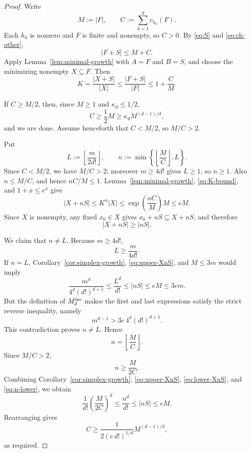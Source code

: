\documentclass[11pt]{article}
\theoremstyle{definition}
\newcommand{\1}{\mathbf{1}}
\begin{document}
\begin{proof}
Write
\[
  M:=|F|,
  \qquad
  C:=\sum_{k=1}^d c_{h_k}(F).
\]
Each $h_k$ is nonzero and $F$ is finite and nonempty, so $C>0$.  By \eqref{eq:S} and \eqref{eq:ch-other},
\begin{equation}\label{eq:FplusS}
  |F+S|
  \le M+C.
\end{equation}
Apply Lemma~\ref{lem:minimal-growth} with $A=F$ and $B=S$, and choose the minimizing nonempty $X\subseteq F$.  Then
\begin{equation}\label{eq:K-bound}
  K=\frac{|X+S|}{|X|}
  \le\frac{|F+S|}{|F|}
  \le1+\frac CM.
\end{equation}

If $C\ge M/2$, then, since $M\ge1$ and $\kappa_d\le1/2$,
\[
  C\ge\frac12M\ge\kappa_d M^{(d-1)/d},
\]
and we are done.  Assume henceforth that $C<M/2$, so $M/C>2$.

Put
\begin{equation}\label{eq:L-n}
  L:=\left\lfloor\frac{m}{2d!}\right\rfloor,
  \qquad
  n:=\min\left\{\left\lfloor\frac MC\right\rfloor,L\right\}.
\end{equation}
Since $C<M/2$, we have $M/C>2$; moreover $m\ge4d!$ gives $L\ge1$, so $n\ge1$.  Also $n\le M/C$, and hence $nC/M\le1$.  Lemma~\ref{lem:minimal-growth}, \eqref{eq:K-bound}, and $1+x\le e^x$ give
\begin{equation}\label{eq:upper-XnS}
  |X+nS|
  \le K^n|X|
  \le\exp\!\left(\frac{nC}{M}\right)M
  \le eM.
\end{equation}
Since $X$ is nonempty, any fixed $x_0\in X$ gives $x_0+nS\subseteq X+nS$, and therefore
\begin{equation}\label{eq:lower-XnS}
  |X+nS|\ge|nS|.
\end{equation}

We claim that $n\ne L$.  Because $m\ge4d!$,
\[
  L\ge\frac{m}{4d!}.
\]
If $n=L$, Corollary~\ref{cor:simplex-growth}, \eqref{eq:upper-XnS}, and $M\le3m$ would imply
\[
  \frac{m^d}{4^d(d!)^{d+1}}
  \le\frac{L^d}{d!}
  \le |nS|
  \le eM
  \le3em.
\]
But the definition of $M_d^{\rm iso}$ makes the first and last expressions satisfy the strict reverse inequality, namely
\[
  m^{d-1}>3e\,4^d(d!)^{d+1}.
\]
This contradiction proves $n\ne L$.  Hence
\[
  n=\left\lfloor\frac MC\right\rfloor.
\]
Since $M/C>2$,
\begin{equation}\label{eq:n-lower}
  n\ge\frac{M}{2C}.
\end{equation}
Combining Corollary~\ref{cor:simplex-growth}, \eqref{eq:upper-XnS}, \eqref{eq:lower-XnS}, and \eqref{eq:n-lower}, we obtain
\[
  \frac1{d!}\left(\frac{M}{2C}\right)^d
  \le\frac{n^d}{d!}
  \le|nS|
  \le eM.
\]
Rearranging gives
\[
  C\ge\frac1{2(e\,d!)^{1/d}}M^{(d-1)/d},
\]
as required.
\end{proof}
\end{document}
